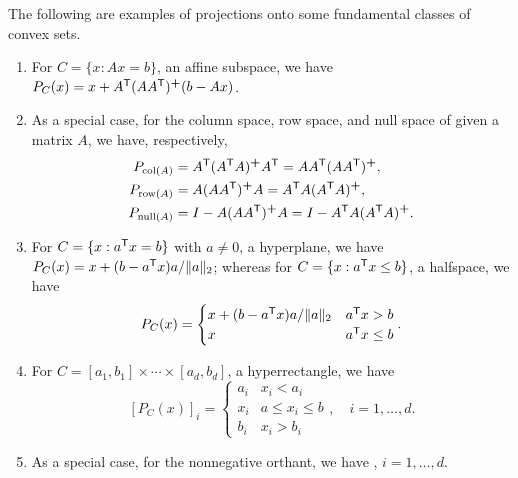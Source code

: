 \begin{Example}
\label{xa:projection_mappings}
The following are examples of projections onto some fundamental classes of
convex sets.

\begin{enumerate}[label=\alph*., ref=\alph*]
\item For $C = \{x : Ax = b\}$, an affine subspace, we have $P_C(x) = x + A^{\mathsf{T}}
  (A A^{\mathsf{T}})^{\bm{+}} (b - Ax)$.  

\item {}
  As a special case, for the column space, row space, and null space of given a
  matrix $A$, we have, respectively,  
  \begin{align*}
  P_{\operatorname{col}(A)} &= A^{\mathsf{T}} (A^{\mathsf{T}} A)^{\bm{+}} A^{\mathsf{T}} = A A^{\mathsf{T}} (A A^{\mathsf{T}})^{\bm{+}}, \\
  P_{\operatorname{row}(A)} &= A (A A^{\mathsf{T}})^{\bm{+}} A = A^{\mathsf{T}} A (A^{\mathsf{T}} A)^{\bm{+}}, \\
  P_{\operatorname{null}(A)} &= I - A (A A^{\mathsf{T}})^{\bm{+}} A = I - A^{\mathsf{T}} A (A^{\mathsf{T}} A)^{\bm{+}}.
  \end{align*}

\item For $C = \{x : a^{\mathsf{T}} x = b\}$ with $a \not= 0$, a hyperplane, we have
  $P_C(x) = x + (b - a^{\mathsf{T}} x) a / \|a\|_2$; whereas for $C = \{x : a^{\mathsf{T}} x \leq
  b\}$, a halfspace, we have   
  \[
  P_C(x) = 
  \begin{cases}
  x + (b - a^{\mathsf{T}} x) a / \|a\|_2 & a^{\mathsf{T}} x > b \\
  x & a^{\mathsf{T}} x \leq b
  \end{cases}.
  \]

\item For $C = [a_1, b_1] \times \cdots \times [a_d, b_d]$, a hyperrectangle, we
  have  
  \[
  [P_C(x)]_i = 
  \begin{cases}
  a_i & x_i < a_i \\
  x_i & a \leq x_i \leq b \\
  b_i & x_i > b_i
  \end{cases},
  \quad i = 1,\ldots,d.
  \]

\item As a special case, for the nonnegative orthant, we have
  , $i=1,\ldots,d$.  


\end{enumerate}
\end{Example}

